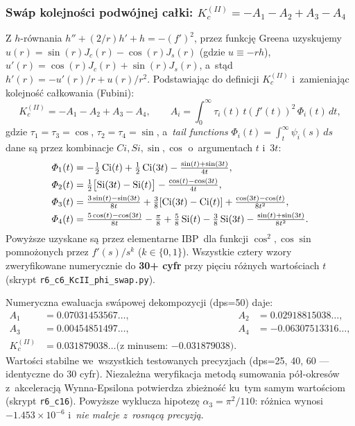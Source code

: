 \subsubsection{Sw\'ap kolejno\'sci podwójnej ca\l{}ki: $K_c^{(II)} = -A_1 - A_2 + A_3 - A_4$}
\label{sec:T6-swap}

Z $h$-r\'ownania $h'' + (2/r) h' + h = -(f')^2$, przez funkcj\k{e} Greena uzyskujemy
$u(r) = \sin(r) J_c(r) - \cos(r) J_s(r)$ (gdzie $u \equiv -rh$),
$u'(r) = \cos(r) J_c(r) + \sin(r) J_s(r)$, a~st\k{a}d
$h'(r) = -u'(r)/r + u(r)/r^2$. Podstawiaj\k{a}c do definicji $K_c^{(II)}$
i~zamieniaj\k{a}c kolejno\'s\'c ca\l{}kowania (Fubini):
\begin{equation}
  K_c^{(II)} = -A_1 - A_2 + A_3 - A_4,
  \qquad A_i = \int_0^\infty \tau_i(t)\, t (f'(t))^2\, \Phi_i(t)\, dt,
\end{equation}
gdzie $\tau_1 = \tau_3 = \cos$, $\tau_2 = \tau_4 = \sin$, a~\emph{tail functions}
$\Phi_i(t) = \int_t^\infty \psi_i(s)\, ds$ dane s\k{a} przez kombinacje
$Ci, Si, \sin, \cos$ o~argumentach $t$ i~$3t$:
\begin{align}
  \varPhi_1(t) &= -\tfrac{1}{2} \operatorname{Ci}(t) + \tfrac{1}{2} \operatorname{Ci}(3t) - \tfrac{\sin(t)+\sin(3t)}{4t}, \\
  \varPhi_2(t) &= \tfrac{1}{2}\bigl[\operatorname{Si}(3t) - \operatorname{Si}(t)\bigr] - \tfrac{\cos(t) - \cos(3t)}{4t}, \\
  \varPhi_3(t) &= \tfrac{3\sin(t) - \sin(3t)}{8t} + \tfrac{3}{8}[\operatorname{Ci}(3t) - \operatorname{Ci}(t)]
              + \tfrac{\cos(3t) - \cos(t)}{8 t^2}, \\
  \varPhi_4(t) &= \tfrac{5\cos(t) - \cos(3t)}{8t} - \tfrac{\pi}{8} + \tfrac{5}{8}\operatorname{Si}(t)
              - \tfrac{3}{8}\operatorname{Si}(3t) - \tfrac{\sin(t) + \sin(3t)}{8 t^2}.
\end{align}
Powy\.zsze uzyskane s\k{a} przez elementarne IBP~dla funkcji $\cos^2, \cos\sin$
pomno\.zonych przez $f'(s)/s^k$ ($k \in \{0,1\}$). Wszystkie cztery wzory
zweryfikowane numerycznie do \textbf{30+ cyfr} przy pi\k{e}ciu r\'o\.znych warto\'sciach $t$
(skrypt \texttt{r6\_c6\_KcII\_phi\_swap.py}).

Numeryczna ewaluacja sw\'apowej dekompozycji (dps=50) daje:
\begin{align}
  A_1 &= 0.07031453567\ldots, &
  A_2 &= 0.02918815038\ldots, \\
  A_3 &= 0.00454851497\ldots, &
  A_4 &= -0.06307513316\ldots, \\
  K_c^{(II)} &= 0.031879038\ldots \text{(z minusem: $-0.031879038$)}.
\end{align}
Warto\'sci stabilne we~wszystkich testowanych precyzjach (dps=25, 40, 60 ---
identyczne do 30 cyfr). Niezale\.zna weryfikacja metod\k{a} sumowania
p\'o\l{}-okres\'ow z~akceleracj\k{a} Wynna-Epsilona potwierdza zbie\.zno\'s\'c
ku~tym samym warto\'sciom (skrypt \texttt{r6\_c16}).
Powy\.zsze wyklucza hipotez\k{e} $\alpha_3 = \pi^2/110$:
r\'o\.znica wynosi $-1.453 \times 10^{-6}$ i~\emph{nie maleje z~rosn\k{a}c\k{a} precyzj\k{a}}.

